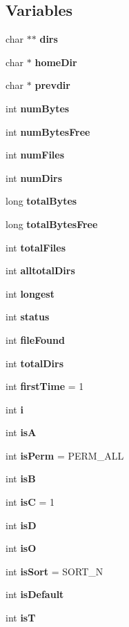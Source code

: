 \subsection*{Variables}
\begin{CompactItemize}
\item 
char $\ast$$\ast$ {\bf dirs}
\item 
char $\ast$ {\bf home\-Dir}
\item 
char $\ast$ {\bf prevdir}
\item 
int {\bf num\-Bytes}
\item 
int {\bf num\-Bytes\-Free}
\item 
int {\bf num\-Files}
\item 
int {\bf num\-Dirs}
\item 
long {\bf total\-Bytes}
\item 
long {\bf total\-Bytes\-Free}
\item 
int {\bf total\-Files}
\item 
int {\bf alltotal\-Dirs}
\item 
int {\bf longest}
\item 
int {\bf status}
\item 
int {\bf file\-Found}
\item 
int {\bf total\-Dirs}
\item 
int {\bf first\-Time} = 1
\item 
int {\bf i}
\item 
int {\bf is\-A}
\item 
int {\bf is\-Perm} = PERM\_\-ALL\label{dir_8c_751013063353ff78ee942c99bebac30f}

\item 
int {\bf is\-B}\label{dir_8c_9849fbaf04c204000693d1788548b58b}

\item 
int {\bf is\-C} = 1\label{dir_8c_b2e184614ace2f5dcf26ca03d9be5554}

\item 
int {\bf is\-D}\label{dir_8c_635a4ee08d2cef4ff88dced50efa31e6}

\item 
int {\bf is\-O}\label{dir_8c_f0c5dab1fda5208d84f0d282c656666a}

\item 
int {\bf is\-Sort} = SORT\_\-N\label{dir_8c_1bf67ef7f6128c894d258f01baa25296}

\item 
int {\bf is\-Default}\label{dir_8c_0c015e0f19ed9410d3c6910287b0294b}

\item 
int {\bf is\-T}\label{dir_8c_eb25c0813c5be498509bf1cfaffd5f9d}


\end{CompactItemize}
